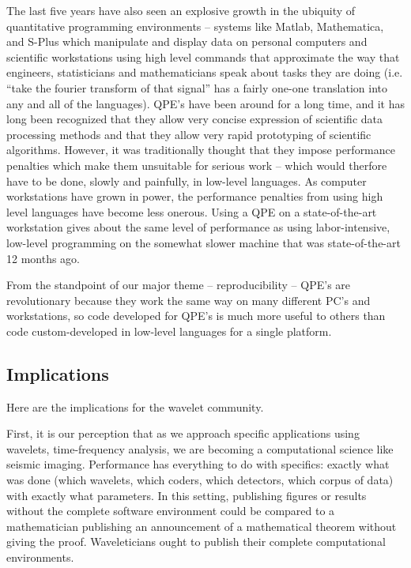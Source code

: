 The last five years have also seen an explosive growth in the
ubiquity of quantitative programming environments -- systems
like Matlab, Mathematica, and S-Plus which manipulate and display data
on personal computers and scientific workstations
using high level commands that approximate the way that
engineers, statisticians and mathematicians speak about 
tasks they are doing (i.e. ``take the fourier transform of that signal''
has a fairly one-one translation into any and all of the languages).
QPE's have been around for a long
time, and it has long been recognized that they allow very concise
expression of scientific data processing methods
and that they allow very rapid prototyping
of scientific algorithms. However, it was traditionally thought that they
impose performance penalties which make them unsuitable
for serious work -- which would therfore have to be done,
slowly and painfully, in low-level languages.
As computer workstations have grown in power, the performance penalties
from using high level languages have become less onerous.  Using
a QPE on 
a state-of-the-art workstation gives about the
same level of performance as using
labor-intensive, low-level programming on the somewhat slower machine that was 
state-of-the-art 12 months ago.  

From the standpoint of our major theme -- reproducibility -- QPE's
are revolutionary because they work the same way on many different PC's and workstations,
so code developed for QPE's is much more useful
to others than code custom-developed in low-level languages
for a single platform.

\subsection{Implications}

Here are the implications for the wavelet community.  

First, it is our
perception that as we approach specific applications using wavelets, time-frequency
analysis, we are becoming
a computational science like seismic imaging.  Performance has
everything to do with specifics: exactly what was done (which wavelets, which
coders, which detectors, which corpus of data) with exactly what parameters.  In this
setting, publishing figures or results without the complete  software environment
could be compared to a mathematician publishing an announcement of a  mathematical theorem 
without giving the proof.  Waveleticians ought to publish
their complete computational environments.

